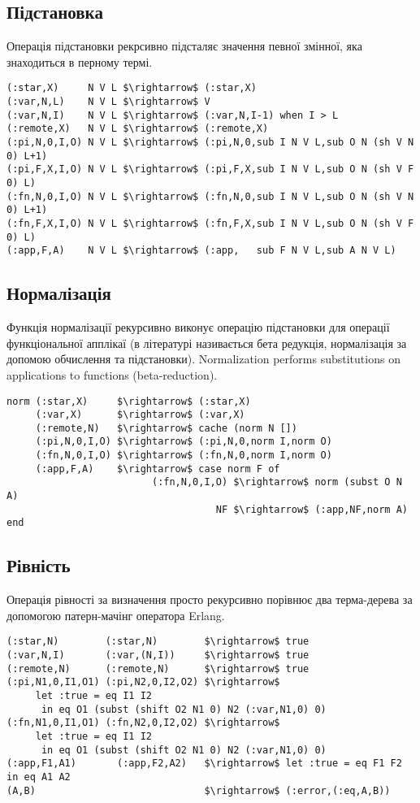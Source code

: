\documentclass{article}
\begin{document}
\subsection{Підстановка}
Операція підстановки рекрсивно підсталяє значення певної змінної, яка знаходиться в перному термі.

\begin{lstlisting}[mathescape=true]
(:star,X)     N V L $\rightarrow$ (:star,X)
(:var,N,L)    N V L $\rightarrow$ V
(:var,N,I)    N V L $\rightarrow$ (:var,N,I-1) when I > L
(:remote,X)   N V L $\rightarrow$ (:remote,X)
(:pi,N,0,I,O) N V L $\rightarrow$ (:pi,N,0,sub I N V L,sub O N (sh V N 0) L+1)
(:pi,F,X,I,O) N V L $\rightarrow$ (:pi,F,X,sub I N V L,sub O N (sh V F 0) L)
(:fn,N,0,I,O) N V L $\rightarrow$ (:fn,N,0,sub I N V L,sub O N (sh V N 0) L+1)
(:fn,F,X,I,O) N V L $\rightarrow$ (:fn,F,X,sub I N V L,sub O N (sh V F 0) L)
(:app,F,A)    N V L $\rightarrow$ (:app,   sub F N V L,sub A N V L)
\end{lstlisting}

\subsection{Нормалізація}
Функція нормалізації рекурсивно виконує операцію підстановки для операції функціональної апплікаї
(в літературі називається бета редукція, нормалізація за допомою обчислення та підстановки).
Normalization performs substitutions on applications to functions (beta-reduction).

\begin{lstlisting}[mathescape=true]
norm (:star,X)     $\rightarrow$ (:star,X)
     (:var,X)      $\rightarrow$ (:var,X)
     (:remote,N)   $\rightarrow$ cache (norm N [])
     (:pi,N,0,I,O) $\rightarrow$ (:pi,N,0,norm I,norm O)
     (:fn,N,0,I,O) $\rightarrow$ (:fn,N,0,norm I,norm O)
     (:app,F,A)    $\rightarrow$ case norm F of
                         (:fn,N,0,I,O) $\rightarrow$ norm (subst O N A)
                                    NF $\rightarrow$ (:app,NF,norm A) end
\end{lstlisting}

\subsection{Рівність}

Операція рівності за визначення просто рекурсивно порівнює два терма-дерева за допомогою патерн-мачінг оператора Erlang.

\begin{lstlisting}[mathescape=true]
(:star,N)        (:star,N)        $\rightarrow$ true
(:var,N,I)       (:var,(N,I))     $\rightarrow$ true
(:remote,N)      (:remote,N)      $\rightarrow$ true
(:pi,N1,0,I1,O1) (:pi,N2,0,I2,O2) $\rightarrow$
     let :true = eq I1 I2
      in eq O1 (subst (shift O2 N1 0) N2 (:var,N1,0) 0)
(:fn,N1,0,I1,O1) (:fn,N2,0,I2,O2) $\rightarrow$
     let :true = eq I1 I2
      in eq O1 (subst (shift O2 N1 0) N2 (:var,N1,0) 0)
(:app,F1,A1)       (:app,F2,A2)   $\rightarrow$ let :true = eq F1 F2 in eq A1 A2
(A,B)                             $\rightarrow$ (:error,(:eq,A,B))
\end{lstlisting}
\end{document}
